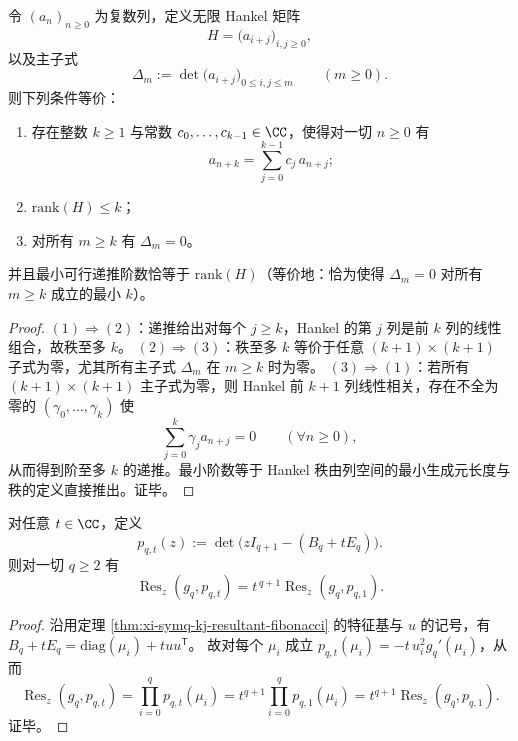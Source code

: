 \begin{theorem}\label{thm:xi-hankel-rank-linear-recurrence}
令 \((a_n)_{n\ge 0}\) 为复数列，定义无限 Hankel 矩阵
\[
H=\bigl(a_{i+j}\bigr)_{i,j\ge 0},
\]
以及主子式
\[
\Delta_m:=\det\bigl(a_{i+j}\bigr)_{0\le i,j\le m}\qquad(m\ge 0).
\]
则下列条件等价：
\begin{enumerate}
  \item 存在整数 \(k\ge 1\) 与常数 \(c_0,\dots,c_{k-1}\in\CC\)，使得对一切 \(n\ge 0\) 有
  \[
  a_{n+k}=\sum_{j=0}^{k-1}c_j\,a_{n+j};
  \]
  \item \(\mathrm{rank}(H)\le k\)；
  \item 对所有 \(m\ge k\) 有 \(\Delta_m=0\)。
\end{enumerate}
并且最小可行递推阶数恰等于 \(\mathrm{rank}(H)\)（等价地：恰为使得 \(\Delta_m=0\) 对所有 \(m\ge k\) 成立的最小 \(k\)）。
\end{theorem}
\begin{proof}
\((1)\Rightarrow(2)\)：递推给出对每个 \(j\ge k\)，Hankel 的第 \(j\) 列是前 \(k\) 列的线性组合，故秩至多 \(k\)。
\((2)\Rightarrow(3)\)：秩至多 \(k\) 等价于任意 \((k+1)\times(k+1)\) 子式为零，尤其所有主子式 \(\Delta_m\) 在 \(m\ge k\) 时为零。
\((3)\Rightarrow(1)\)：若所有 \((k+1)\times(k+1)\) 主子式为零，则 Hankel 前 \(k+1\) 列线性相关，存在不全为零的 \((\gamma_0,\dots,\gamma_k)\) 使
\[
\sum_{j=0}^k \gamma_j a_{n+j}=0\qquad(\forall n\ge 0),
\]
从而得到阶至多 \(k\) 的递推。最小阶数等于 Hankel 秩由列空间的最小生成元长度与秩的定义直接推出。证毕。
\end{proof}

\begin{proposition}[耦合参数的主因子定律]\label{prop:xi-symq-rankone-coupling-t-power}
对任意 \(t\in\CC\)，定义
\[
p_{q,t}(z):=\det\!\bigl(zI_{q+1}-(B_q+tE_q)\bigr).
\]
则对一切 \(q\ge 2\) 有
\[
\operatorname{Res}_z(g_q,p_{q,t})
=t^{\,q+1}\operatorname{Res}_z(g_q,p_{q,1}).
\]
\end{proposition}
\begin{proof}
沿用定理 \ref{thm:xi-symq-kj-resultant-fibonacci} 的特征基与 \(u\) 的记号，有
\(
B_q+tE_q=\mathrm{diag}(\mu_i)+tuu^{\mathsf T}
\)。
故对每个 \(\mu_i\) 成立 \(p_{q,t}(\mu_i)=-t\,u_i^2g_q'(\mu_i)\)，从而
\[
\operatorname{Res}_z(g_q,p_{q,t})
=\prod_{i=0}^{q}p_{q,t}(\mu_i)
=t^{q+1}\prod_{i=0}^{q}p_{q,1}(\mu_i)
=t^{q+1}\operatorname{Res}_z(g_q,p_{q,1}).
\]
证毕。
\end{proof}

